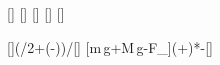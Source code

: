 [\meter]
[\kg]
[\kg]
[\meter]
[\mpss]

[]{(\mBX*\gX*\LBX/2+\mEX*\gX*(\LBX-\xEX))/\LBX}[\newton]
[m\,g+M\,g-F_]{(\mBX+\mEX)*\gX-\FhX}[\newton]
